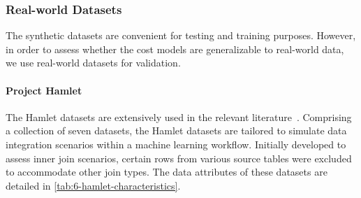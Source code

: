 \subsubsection{Real-world Datasets}
The synthetic datasets are convenient for testing and training purposes. However, in order to assess whether the cost models are generalizable to real-world data, we use real-world datasets for validation.

\paragraph{Project Hamlet~\cite{2016-hamlet-sigmod}}
The Hamlet datasets are extensively used in the relevant literature~\cite{2016-hamlet-sigmod, amalur, morpheus,orion_learning_gen_lin_models}. Comprising a collection of seven datasets, the Hamlet datasets are tailored to simulate data integration scenarios within a machine learning workflow. Initially developed to assess inner join scenarios, certain rows from various source tables were excluded to accommodate other join types. The data attributes of these datasets are detailed in \autoref{tab:6-hamlet-characteristics}.

